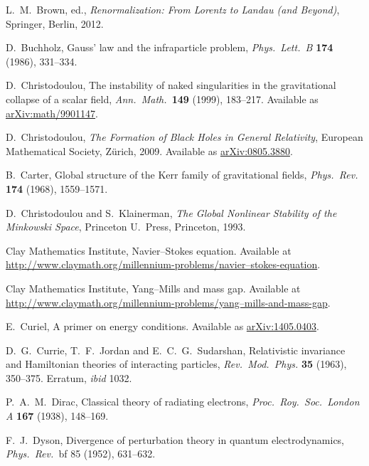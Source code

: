 \documentclass[12pt]{article}
\begin{document}
\begin{thebibliography}{10}
 L.\ M.\ Brown, ed., \textsl{Renormalization: From Lorentz to Landau (and Beyond)}, Springer, Berlin, 2012.

 D.\ Buchholz, Gauss' law and the infraparticle problem, 
\textsl{Phys.\ Lett.\ B} \textbf{174} (1986), 331--334.

 D.\ Christodoulou, The instability of naked singularities in the gravitational collapse of a scalar field, \textsl{Ann.\ Math.\ }\textbf{149} (1999), 183--217.  Available as \href{http://arxiv.org/abs/math/9901147}{arXiv:math/9901147}.

 D.\ Christodoulou, \textsl{The Formation of Black Holes in General Relativity}, European Mathematical Society, Z\"urich, 2009.  Available as \href{http://arxiv.org/abs/0805.3880}{arXiv:0805.3880}.

 B.\ Carter, Global structure of the Kerr family of gravitational fields, \textsl{Phys.\ Rev.} \textbf{174} (1968), 1559--1571.

 D.\ Christodoulou and S.\ Klainerman, \textsl{The Global Nonlinear Stability of the Minkowski Space}, Princeton U.\ Press, Princeton, 1993.

 Clay Mathematics Institute, Navier--Stokes equation.  Available at
\href{http://www.claymath.org/millennium-problems/navier\%E2\%80\%93stokes-equation}{http://www.claymath.org/millennium-problems/navier--stokes-equation}.

 Clay Mathematics Institute, Yang--Mills and mass gap.  Available at \break \href{http://www.claymath.org/millennium-problems/yang\%E2\%80\%93mills-and-mass-gap}{http://www.claymath.org/millennium-problems/yang--mills-and-mass-gap}.

 E.\ Curiel, A primer on energy conditions.  Available as
\href{https://arxiv.org/abs/1405.0403}{arXiv:1405.0403}.

 D.\ G.\ Currie, T.\ F.\ Jordan and E.\ C.\ G.\ Sudarshan, Relativistic invariance and Hamiltonian theories of interacting particles, \textsl{Rev.\  Mod.\ Phys.} {\bf 35} (1963), 350--375.  Erratum, \emph{ibid} 1032.

 P.\ A.\ M.\ Dirac, Classical theory of radiating electrons, \textsl{Proc.\ Roy.\ Soc.\ London A} \textbf{167} (1938), 148--169.

 F.\ J.\ Dyson, Divergence of perturbation theory in quantum electrodynamics, \textsl{Phys.\ Rev.\ }{bf 85} (1952), 631--632.


\end{thebibliography}
\end{document}
